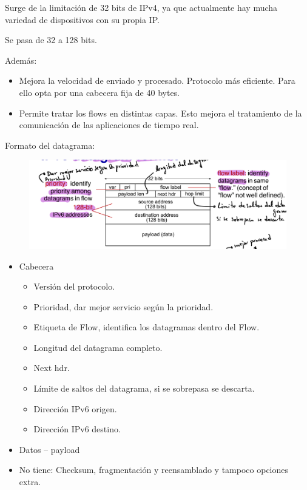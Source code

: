 \documentclass[12pt, twoside, openright]{report} %
\begin{document}
Surge de la limitación de 32 bits de IPv4, ya que actualmente hay
mucha variedad de dispositivos con su propia IP.

Se pasa de 32 a 128 bits.

Además:

\begin{itemize}
	\item Mejora la velocidad de enviado y procesado. Protocolo más eficiente.
	      Para ello opta por una cabecera fija de 40 bytes.
	\item Permite tratar los flows en distintas capas. Esto mejora el
	      tratamiento de la comunicación de las aplicaciones de tiempo real.
\end{itemize}

Formato del datagrama:
\begin{figure}[H]
	{\includegraphics[scale=.3]{Untitled 36.png}}
\end{figure}
\pagebreak
\begin{itemize}
	\item Cabecera

	      \begin{itemize}
		      \item Versión del protocolo.
		      \item Prioridad, dar mejor servicio según la prioridad.
		      \item Etiqueta de Flow, identifica los datagramas dentro del Flow.
		      \item Longitud del datagrama completo.
		      \item Next hdr.
		      \item Límite de saltos del datagrama, si se sobrepasa se descarta.
		      \item Dirección IPv6 origen.
		      \item Dirección IPv6 destino.
	      \end{itemize}
	\item Datos -- payload
	\item No tiene: Checksum, fragmentación y reensamblado y tampoco opciones
	      extra.
\end{itemize}
\end{document}
